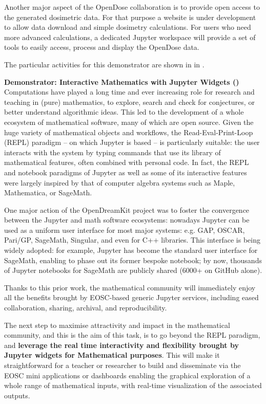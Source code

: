   Another major aspect of the OpenDose collaboration is to provide open
  access to the generated dosimetric data. For that purpose a website is under
  development to allow data download and simple dosimetry calculations. For
  users who need more advanced calculations, a dedicated Jupyter workspace will
  provide a set of tools to easily access, process and display the OpenDose
  data.

  The particular activities for this demonstrator are shown in
   in .

\medskip
\noindent\textbf{Demonstrator: Interactive Mathematics with Jupyter Widgets ()}\label{sec:concept-demonstrator-math}\\
  Computations have played a long time and ever increasing role for
  research and teaching in (pure) mathematics, to explore, search and
  check for conjectures, or better understand algorithmic ideas. This
  led to the development of a whole ecosystem of mathematical
  software, many of which are open source. Given the huge variety of
  mathematical objects and workflows, the Read-Eval-Print-Loop (REPL)
  paradigm -- on which Jupyter is based -- is particularly suitable:
  the user interacts with the system by typing commands that use its
  library of mathematical features, often combined with personal code.
  In fact, the REPL and notebook paradigms of Jupyter as well as some
  of its interactive features were largely inspired by that of
  computer algebra systems such as Maple, Mathematica, or SageMath.

  One major action of the OpenDreamKit project was to foster the
  convergence between the Jupyter and math software ecosystems:
  nowadays Jupyter can be used as a uniform user interface for most
  major systems: e.g. GAP, OSCAR, Pari/GP, SageMath, Singular, and
  even for C++ libraries. This interface is being widely adopted: for
  example, Jupyter has become the standard user interface for
  SageMath, enabling to phase out its former bespoke notebook; by now,
  thousands of Jupyter notebooks for SageMath are publicly shared
  (6000+ on GitHub alone).

  Thanks to this prior work, the mathematical community will
  immediately enjoy all the benefits brought by EOSC-based generic
  Jupyter services, including eased collaboration, sharing, archival,
  and reproducibility.

  The next step to maximise attractivity and impact in the
  mathematical community, and this is the aim of this task, is to go
  beyond the REPL paradigm, and \textbf{leverage the real time
    interactivity and flexibility brought by Jupyter widgets for
    Mathematical purposes}. This will make it straightforward for a teacher or
  researcher to build and disseminate via the EOSC mini applications
  or dashboards enabling the graphical exploration of a whole range of
  mathematical inputs, with real-time visualization of the associated
  outputs.

